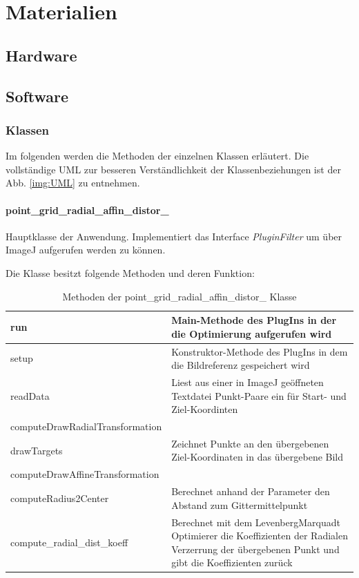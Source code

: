 
\section{Materialien}\label{sec:Materials}

\subsection{Hardware}\label{sec:Hardware}
\subsection{Software}

\subsubsection{Klassen}

Im folgenden werden die Methoden der einzelnen Klassen erläutert. Die vollständige UML zur besseren Verständlichkeit der Klassenbeziehungen ist der Abb. \ref{img:UML} zu entnehmen.

\paragraph{point\_grid\_radial\_affin\_distor\_}
Hauptklasse der Anwendung. Implementiert das Interface \emph{PluginFilter} um über ImageJ aufgerufen werden zu können.

Die Klasse besitzt folgende Methoden und deren Funktion:

\begin{table}[H]
\begin{tabular}{p{} | p{}} 
run & Main-Methode des PlugIns in der die Optimierung aufgerufen wird\\ \hline
setup & Konstruktor-Methode des PlugIns in dem die Bildreferenz gespeichert wird\\ \hline
readData & Liest aus einer in ImageJ geöffneten Textdatei Punkt-Paare ein für Start- und Ziel-Koordinten\\
computeDrawRadialTransformation & \\ \hline
drawTargets & Zeichnet Punkte an den übergebenen Ziel-Koordinaten in das übergebene Bild\\ \hline
computeDrawAffineTransformation & \\ \hline
computeRadius2Center & Berechnet anhand der Parameter den Abstand zum Gittermittelpunkt\\ \hline
compute\_radial\_dist\_koeff & Berechnet mit dem LevenbergMarquadt Optimierer die Koeffizienten der Radialen Verzerrung der übergebenen Punkt und gibt die Koeffizienten zurück\\ 
\end{tabular}
\caption{Methoden der point\_grid\_radial\_affin\_distor\_ Klasse}
\end{table}
